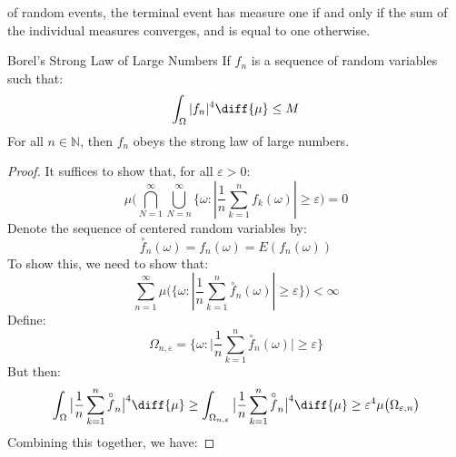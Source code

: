     of random events, the terminal event has measure one
    if and only if the sum of the individual measures converges,
    and is equal to one otherwise.
    \begin{ltheorem}{Borel's Strong Law of Large Numbers}
        If $f_{n}$ is a sequence of random variables such that:
        \begin{equation}
            \int_{\Omega}|f_{n}|^{4}\diff{\mu}\leq{M}
        \end{equation}
        For all $n\in\mathbb{N}$, then $f_{n}$ obeys the
        strong law of large numbers.
    \end{ltheorem}
    \begin{proof}
        It suffices to show that, for all $\varepsilon>0$:
        \begin{equation}
            \mu\Big(\bigcap_{N=1}^{\infty}
                \bigcup_{N=n}^{\infty}
                \big\{\omega:|\frac{1}{n}\sum_{k=1}^{n}
                    f_{k}(\omega)|\geq\varepsilon\Big)=0
        \end{equation}
        Denote the sequence of centered random variables by:
        \begin{equation}
            \overset{\circ}{f}_{n}(\omega)=
            f_{n}(\omega)=E(f_{n}(\omega))
        \end{equation}
        To show this, we need to show that:
        \begin{equation}
            \sum_{n=1}^{\infty}\mu\Big(
                \big\{\omega:|\frac{1}{n}\sum_{k=1}^{n}
                    \overset{\circ}{f}_{n}(\omega)|
                    \geq\varepsilon\big\}\Big)<\infty
        \end{equation}
        Define:
        \begin{equation}
            \Omega_{n,\varepsilon}=
            \Big\{\omega:\big|\frac{1}{n}\sum_{k=1}^{n}
                \overset{\circ}{f}_{n}(\omega)\big|
                \geq\varepsilon\Big\}
        \end{equation}
        But then:
        \begin{equation}
            \int_{\Omega}\big|\frac{1}{n}\sum_{k=1}^{n}
                \overset{\circ}{f}_{n}\big|^{4}\diff{\mu}
            \geq\int_{\Omega_{n,\varepsilon}}
            \big|\frac{1}{n}\sum_{k=1}^{n}
                \overset{\circ}{f}_{n}\big|^{4}\diff{\mu}
            \geq\varepsilon^{4}
                \mu\big(\Omega_{\varepsilon,n}\big)
        \end{equation}
        Combining this together, we have:

\end{proof}
